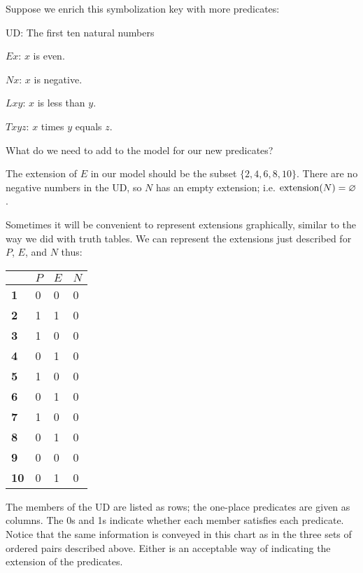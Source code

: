 Suppose we enrich this symbolization key with more predicates:
\label{10UD}
\begin{ekey}
\item{UD:} The first ten natural numbers
\item{$Ex$:} $x$ is even.
\item{$Nx$:} $x$ is negative.
\item{$Lxy$:} $x$ is less than $y$.
\item{$Txyz$:} $x$ times $y$ equals $z$.
\end{ekey}
What do we need to add to the model for our new predicates?

The extension of $E$ in our model should be the subset $\{2, 4, 6, 8, 10\}$. There are no negative numbers in the UD, so $N$ has an empty extension; i.e. $\mbox{extension}(N)=\varnothing$.

Sometimes it will be convenient to represent extensions graphically, similar to the way we did with truth tables. We can represent the extensions just described for $P$, $E$, and $N$ thus:

\begin{table}[h!]
\centering
\begin{tabular}{l|l|l|l}
            & $P$ & $E$ & $N$ \\ \hline
\textbf{1}  & 0  & 0          & 0          \\
\textbf{2}  & 1  & 1          & 0          \\
\textbf{3}  & 1  & 0          & 0          \\
\textbf{4}  & 0  & 1          & 0          \\
\textbf{5}  & 1  & 0          & 0          \\
\textbf{6}  & 0  & 1          & 0          \\
\textbf{7}  & 1  & 0          & 0          \\
\textbf{8}  & 0  & 1          & 0          \\
\textbf{9}  & 0  & 0          & 0          \\
\textbf{10} & 0 & 1          & 0         
\end{tabular}
\end{table}

The members of the UD are listed as rows; the one-place predicates are given as columns. The 0s and 1s indicate whether each member satisfies each predicate. Notice that the same information is conveyed in this chart as in the three sets of ordered pairs described above. Either is an acceptable way of indicating the extension of the predicates.

